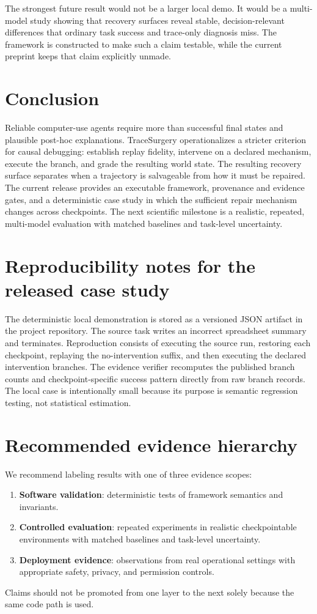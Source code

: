 \documentclass{article}
\begin{document}
The strongest future result would not be a larger local demo. It would be a multi-model study showing that recovery surfaces reveal stable, decision-relevant differences that ordinary task success and trace-only diagnosis miss. The framework is constructed to make such a claim testable, while the current preprint keeps that claim explicitly unmade.

\section{Conclusion}

Reliable computer-use agents require more than successful final states and plausible post-hoc explanations. TraceSurgery operationalizes a stricter criterion for causal debugging: establish replay fidelity, intervene on a declared mechanism, execute the branch, and grade the resulting world state. The resulting recovery surface separates when a trajectory is salvageable from how it must be repaired. The current release provides an executable framework, provenance and evidence gates, and a deterministic case study in which the sufficient repair mechanism changes across checkpoints. The next scientific milestone is a realistic, repeated, multi-model evaluation with matched baselines and task-level uncertainty.




\appendix
\section{Reproducibility notes for the released case study}
The deterministic local demonstration is stored as a versioned JSON artifact in the project repository. The source task writes an incorrect spreadsheet summary and terminates. Reproduction consists of executing the source run, restoring each checkpoint, replaying the no-intervention suffix, and then executing the declared intervention branches. The evidence verifier recomputes the published branch counts and checkpoint-specific success pattern directly from raw branch records. The local case is intentionally small because its purpose is semantic regression testing, not statistical estimation.

\section{Recommended evidence hierarchy}
We recommend labeling results with one of three evidence scopes:
\begin{enumerate}
  \item \textbf{Software validation}: deterministic tests of framework semantics and invariants.
  \item \textbf{Controlled evaluation}: repeated experiments in realistic checkpointable environments with matched baselines and task-level uncertainty.
  \item \textbf{Deployment evidence}: observations from real operational settings with appropriate safety, privacy, and permission controls.
\end{enumerate}
Claims should not be promoted from one layer to the next solely because the same code path is used.
\end{document}
